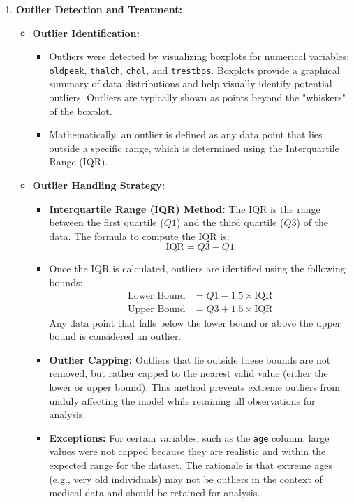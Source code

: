 \documentclass[pdflatex,sn-nature,Numbered]{sn-jnl}%
\theoremstyle{thmstyleone}%
\theoremstyle{thmstyletwo}%
\theoremstyle{thmstylethree}%
\begin{document}
\begin{enumerate}
        
        \item \textbf{Outlier Detection and Treatment:}
    \begin{itemize}
        \item \textbf{Outlier Identification:}
        \begin{itemize}
            \item Outliers were detected by visualizing boxplots for numerical variables: \texttt{oldpeak}, \texttt{thalch}, \texttt{chol}, and \texttt{trestbps}. Boxplots provide a graphical summary of data distributions and help visually identify potential outliers. Outliers are typically shown as points beyond the "whiskers" of the boxplot.
            \item Mathematically, an outlier is defined as any data point that lies outside a specific range, which is determined using the Interquartile Range (IQR). 
        \end{itemize}
        
        \item \textbf{Outlier Handling Strategy:}
        \begin{itemize}
            \item \textbf{Interquartile Range (IQR) Method:} The IQR is the range between the first quartile (\( Q1 \)) and the third quartile (\( Q3 \)) of the data. The formula to compute the IQR is:
            \[
            \text{IQR} = Q3 - Q1
            \]
            \item Once the IQR is calculated, outliers are identified using the following bounds:
            \begin{align*}
                \text{Lower Bound} &= Q1 - 1.5 \times \text{IQR} \\
                \text{Upper Bound} &= Q3 + 1.5 \times \text{IQR}
            \end{align*}
            Any data point that falls below the lower bound or above the upper bound is considered an outlier.
            
            \item \textbf{Outlier Capping:} Outliers that lie outside these bounds are not removed, but rather capped to the nearest valid value (either the lower or upper bound). This method prevents extreme outliers from unduly affecting the model while retaining all observations for analysis.
            \item \textbf{Exceptions:} For certain variables, such as the \texttt{age} column, large values were not capped because they are realistic and within the expected range for the dataset. The rationale is that extreme ages (e.g., very old individuals) may not be outliers in the context of medical data and should be retained for analysis.
        \end{itemize}
    \end{itemize}



\end{enumerate}
\end{document}
